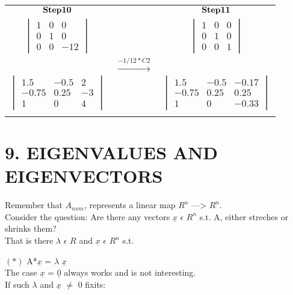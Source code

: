 \documentclass[]{article}
\begin{document}
\begin{tabular}{ c c c  }
$\bold{Step 10}$ &  & $\bold{Step 11}$\\
 $\begin{vmatrix} 1 & 0 & 0\\ 0 & 1 & 0 \\ 0 & 0 & -12 \end{vmatrix}$ &  & $\begin{vmatrix} 1 & 0 & 0\\ 0 & 1 & 0 \\ 0 & 0 & 1 \end{vmatrix}$ \\  
 & $\xrightarrow{-1/12*C2}$\\
 $\begin{vmatrix} 1.5 & -0.5 &   2\\ -0.75 & 0.25 &  -3 \\ 1 &   0 &   4 \end{vmatrix}$ &  & $\begin{vmatrix} 1.5 & -0.5 & -0.17\\ -0.75 & 0.25 & 0.25 \\ 1 & 0 & -0.33\end{vmatrix}$\\
 &  &  \\
\end{tabular}

\endgroup

\newpage

\section{\texorpdfstring{9. EIGENVALUES AND EIGENVECTORS\\
}{9. EIGENVALUES AND EIGENVECTORS }}\label{eigenvalues-and-eigenvectors}

Remember that \(A_{nxm}\), represents a linear map \(R^{n}\)
---\textgreater{} \(R^{n}\).\\
 Consider the question: Are there any vectors \(\underline{x}\)
\(\epsilon\) \(R^{n}\) s.t. A, either streches or shrinks them?\\
 That is there \(\lambda\) \(\epsilon\) \(R\) and \(\underline{x}\)
\(\epsilon\) \(R^{n}\) s.t.\\
 \hspace{3cm}

\((*)\) A*\(\underline{x}\) = \(\lambda\) \(\underline{x}\)\\
 The case \(\underline{x}\) = \(\underline{0}\) always works and is not
interesting.\\
 If such \(\lambda\) and \(\underline{x}\) \(\not=\) 0 fixits:
\end{document}
